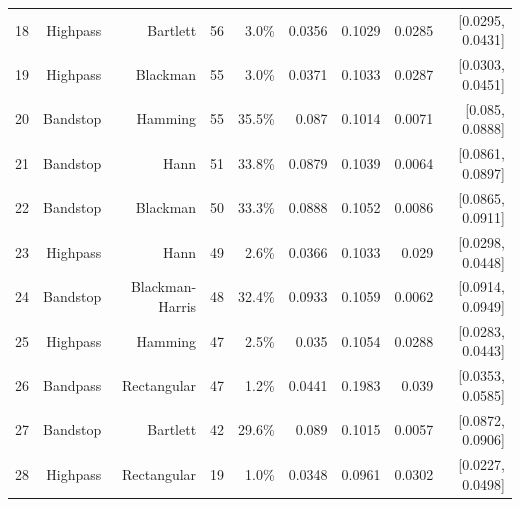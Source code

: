 \begin{longtable}{lrrrrrrrr}
    18 & Highpass & Bartlett & 56 & 3.0\% & 0.0356 & 0.1029 & 0.0285 & [0.0295, 0.0431] \\
    19 & Highpass & Blackman & 55 & 3.0\% & 0.0371 & 0.1033 & 0.0287 & [0.0303, 0.0451] \\
    20 & Bandstop & Hamming & 55 & 35.5\% & 0.087 & 0.1014 & 0.0071 & [0.085, 0.0888] \\
    21 & Bandstop & Hann & 51 & 33.8\% & 0.0879 & 0.1039 & 0.0064 & [0.0861, 0.0897] \\
    22 & Bandstop & Blackman & 50 & 33.3\% & 0.0888 & 0.1052 & 0.0086 & [0.0865, 0.0911] \\
    23 & Highpass & Hann & 49 & 2.6\% & 0.0366 & 0.1033 & 0.029 & [0.0298, 0.0448] \\
    24 & Bandstop & Blackman-Harris & 48 & 32.4\% & 0.0933 & 0.1059 & 0.0062 & [0.0914, 0.0949] \\
    25 & Highpass & Hamming & 47 & 2.5\% & 0.035 & 0.1054 & 0.0288 & [0.0283, 0.0443] \\
    26 & Bandpass & Rectangular & 47 & 1.2\% & 0.0441 & 0.1983 & 0.039 & [0.0353, 0.0585] \\
    27 & Bandstop & Bartlett & 42 & 29.6\% & 0.089 & 0.1015 & 0.0057 & [0.0872, 0.0906] \\
    28 & Highpass & Rectangular & 19 & 1.0\% & 0.0348 & 0.0961 & 0.0302 & [0.0227, 0.0498] \\
    \bottomrule
  \end{longtable}
